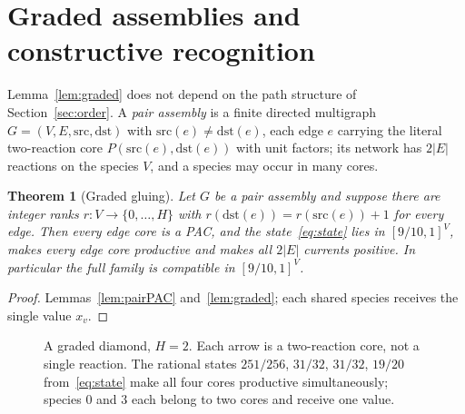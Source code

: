 \documentclass[11pt,a4paper]{article}
\theoremstyle{plain}
\newtheorem{theorem}{Theorem}[section]
\theoremstyle{definition}
\theoremstyle{remark}
\begin{document}
\section{Graded assemblies and constructive recognition}\label{sec:graded}

Lemma~\ref{lem:graded} does not depend on the path structure of Section~\ref{sec:order}. A \emph{pair assembly} is a finite directed multigraph $G=(V,E,\mathrm{src},\mathrm{dst})$ with $\mathrm{src}(e)\ne\mathrm{dst}(e)$, each edge $e$ carrying the literal two-reaction core $P(\mathrm{src}(e),\mathrm{dst}(e))$ with unit factors; its network has $2|E|$ reactions on the species $V$, and a species may occur in many cores.

\begin{theorem}[Graded gluing]\label{thm:graded}
Let $G$ be a pair assembly and suppose there are integer ranks $r\colon V\to\{0,\dots,H\}$ with $r(\mathrm{dst}(e))=r(\mathrm{src}(e))+1$ for every edge. Then every edge core is a PAC, and the state~\eqref{eq:state} lies in $[9/10,1]^V$, makes every edge core productive and makes all $2|E|$ currents positive. In particular the full family is compatible in $[9/10,1]^V$.
\end{theorem}
\begin{proof}
Lemmas~\ref{lem:pairPAC} and~\ref{lem:graded}; each shared species receives the single value $x_v$.
\end{proof}

\begin{figure}[t]
\centering
{}
\caption{A graded diamond, $H=2$. Each arrow is a two-reaction core, not a single reaction. The rational states $251/256$, $31/32$, $31/32$, $19/20$ from~\eqref{eq:state} make all four cores productive simultaneously; species $0$ and $3$ each belong to two cores and receive one value.}
\label{fig:graded}
\end{figure}
\end{document}
